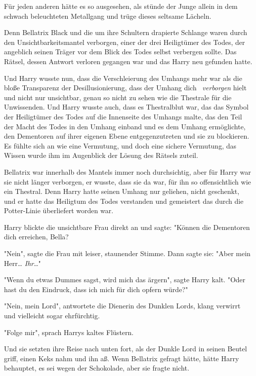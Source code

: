 {Für jeden anderen hätte es so ausgesehen, als stünde der Junge allein in dem schwach beleuchteten Metallgang und trüge dieses seltsame Lächeln.

Denn Bellatrix Black und die um ihre Schultern drapierte Schlange waren durch den Unsichtbarkeitsmantel verborgen, einer der drei Heiligtümer des Todes, der angeblich seinen Träger vor dem Blick des Todes selbst verbergen sollte. Das Rätsel, dessen Antwort verloren gegangen war und das Harry neu gefunden hatte.

Und Harry wusste nun, dass die Verschleierung des Umhangs mehr war als die bloße Transparenz der Desillusionierung, dass der Umhang dich ~\emph{verborgen} hielt und nicht nur unsichtbar, genau so nicht zu sehen wie die Thestrale für die Unwissenden. Und Harry wusste auch, dass es Thestralblut war, das das Symbol der Heiligtümer des Todes auf die Innenseite des Umhangs malte, das den Teil der Macht des Todes in den Umhang einband und es dem Umhang ermöglichte, den Dementoren auf ihrer eigenen Ebene entgegenzutreten und sie zu blockieren. Es fühlte sich an wie eine Vermutung, und doch eine sichere Vermutung, das Wissen wurde ihm im Augenblick der Lösung des Rätsels zuteil.

Bellatrix war innerhalb des Mantels immer noch durchsichtig, aber für Harry war sie nicht länger verborgen, er wusste, dass sie da war, für ihn so offensichtlich wie ein Thestral. Denn Harry hatte seinen Umhang nur geliehen, nicht geschenkt, und er hatte das Heiligtum des Todes verstanden und gemeistert das durch die Potter-Linie überliefert worden war.

Harry blickte die unsichtbare Frau direkt an und sagte: "Können die Dementoren dich erreichen, Bella?

"Nein", sagte die Frau mit leiser, staunender Stimme. Dann sagte sie: "Aber mein Herr… \emph{Ihr}…"

"Wenn du etwas Dummes sagst, wird mich das ärgern", sagte Harry kalt. "Oder hast du den Eindruck, dass ich mich für dich opfern würde?"

"Nein, mein Lord", antwortete die Dienerin des Dunklen Lords, klang verwirrt und vielleicht sogar ehrfürchtig.

"Folge mir", sprach Harrys kaltes Flüstern.

Und sie setzten ihre Reise nach unten fort, als der Dunkle Lord in seinen Beutel griff, einen Keks nahm und ihn aß. Wenn Bellatrix gefragt hätte, hätte Harry behauptet, es sei wegen der Schokolade, aber sie fragte nicht.

}

